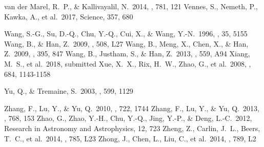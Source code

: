 \documentclass[iop, aj]{emulateapj}
\begin{document}
\begin{thebibliography}{}
 van der Marel, R.~P., \& Kallivayalil, N.\ 2014, \apj, 781, 121
 Vennes, S., Nemeth, P., Kawka, A., et al.\ 2017, Science, 357, 680

 Wang, S.-G., Su, D.-Q., Chu, Y.-Q., Cui, X., \& Wang, Y.-N.\ 1996, \ao, 35, 5155
 Wang, B., \& Han, Z.\ 2009, \aap, 508, L27
 Wang, B., Meng, X., Chen, X., \& Han, Z.\ 2009, \mnras, 395, 847
 Wang, B., Justham, S., \& Han, Z.\ 2013, \aap, 559, A94
 Xiang, M.~S., et al.\ 2018, submitted
 Xue, X.~X., Rix, H.~W., Zhao, G., et al.\ 2008, \apj, 684, 1143-1158

 Yu, Q., \& Tremaine, S.\ 2003, \apj, 599, 1129

 Zhang, F., Lu, Y., \& Yu, Q.\ 2010, \apj, 722, 1744
 Zhang, F., Lu, Y., \& Yu, Q.\ 2013, \apj, 768, 153
 Zhao, G., Zhao, Y.-H., Chu, Y.-Q., Jing, Y.-P., \& Deng, L.-C.\ 2012, Research in Astronomy and Astrophysics, 12, 723
 Zheng, Z., Carlin, J.~L., Beers, T.~C., et al.\ 2014, \apjl, 785, L23
 Zhong, J., Chen, L., Liu, C., et al.\ 2014, \apjl, 789, L2

\end{thebibliography}
\end{document}
